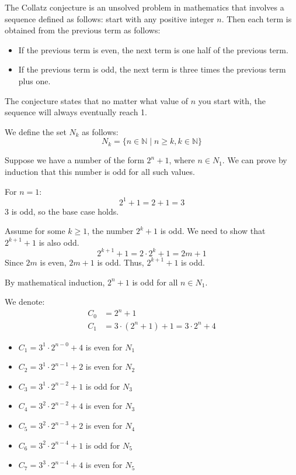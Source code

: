 The Collatz conjecture is an unsolved problem in mathematics that involves a sequence defined as follows: start with any positive integer \(n\). Then each term is obtained from the previous term as follows:
\begin{itemize}
    \item If the previous term is even, the next term is one half of the previous term.
    \item If the previous term is odd, the next term is three times the previous term plus one.
\end{itemize}
The conjecture states that no matter what value of \(n\) you start with, the sequence will always eventually reach 1.

We define the set \(N_k\) as follows:
\[
N_k = \{ n \in \mathbb{N} \mid n \geq k, k \in \mathbb{N} \}
\]

Suppose we have a number of the form \(2^n + 1\), where \(n \in N_1\). We can prove by induction that this number is odd for all such values.

For \(n = 1\):
\[
2^1 + 1 = 2 + 1 = 3
\]
3 is odd, so the base case holds.

Assume for some \(k \geq 1\), the number \(2^k + 1\) is odd. We need to show that \(2^{k+1} + 1\) is also odd.
\[
2^{k+1} + 1 = 2 \cdot 2^k + 1 = 2m + 1
\]
Since \(2m\) is even, \(2m + 1\) is odd. Thus, \(2^{k+1} + 1\) is odd.

By mathematical induction, \(2^n + 1\) is odd for all \(n \in N_1\).

We denote:
\begin{align*}
C_0 &= 2^n + 1 \\
C_1 &= 3 \cdot (2^n + 1) + 1 = 3 \cdot 2^n + 4
\end{align*}

\begin{itemize}
    \item \(C_1 = 3^1 \cdot 2^{n-0} + 4\) is even for \(N_1\)
    \item \(C_2 = 3^1 \cdot 2^{n-1} + 2\) is even for \(N_2\)
    \item \(C_3 = 3^1 \cdot 2^{n-2} + 1\) is odd for \(N_3\)
    \item \(C_4 = 3^2 \cdot 2^{n-2} + 4\) is even for \(N_3\)
    \item \(C_5 = 3^2 \cdot 2^{n-3} + 2\) is even for \(N_4\)
    \item \(C_6 = 3^2 \cdot 2^{n-4} + 1\) is odd for \(N_5\)
    \item \(C_7 = 3^3 \cdot 2^{n-4} + 4\) is even for \(N_5\)
\end{itemize}

